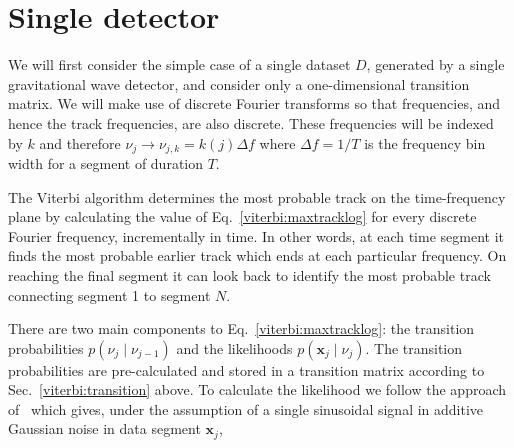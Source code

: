 \section{\label{viterbi:single}Single detector}
%
%
We will first consider the simple case of a single dataset $D$, generated by a single gravitational wave detector, and consider only a one-dimensional transition matrix. We will make use of discrete Fourier transforms so that frequencies, and hence the track frequencies, are also discrete. These frequencies will be indexed by $k$ and therefore $\nu_j \rightarrow \nu_{j,k}=k(j)\Delta f$ where $\Delta f=1/T$ is the frequency bin width for a segment of duration $T$.

 The Viterbi algorithm determines the most probable track on the time-frequency plane by calculating the value of Eq.~\ref{viterbi:maxtracklog} for every discrete Fourier frequency, incrementally in time. In other words, at each time segment it finds the most probable earlier track which ends at each particular frequency. On reaching the final segment it can look back to identify the most probable track connecting segment 1 to segment $N$.

There are two main components to Eq.~\ref{viterbi:maxtracklog}: the transition probabilities $p(\nu_j \mid \nu_{j-1})$ and the likelihoods $p({\bm x_j} \mid \nu_j)$. The transition probabilities are pre-calculated and stored in a transition matrix according to Sec.~\ref{viterbi:transition} above. To calculate the likelihood we follow the approach of~\citep{bretthorst1988BayesianSpectruma} which gives, under the assumption of a single sinusoidal signal in additive Gaussian noise in data segment ${\bm x_j}$, 

